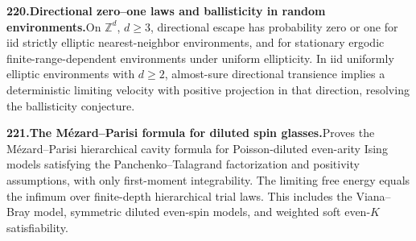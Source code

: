 \documentclass[11pt,a4paper]{article}
\begin{document}
  \par \begin{minipage}{\linewidth}
  \fontsize{10.5}{12.6}\selectfont\RaggedRight
  \hypertarget{result 220}{}
  {\bfseries\textcolor{muted}{220.}\enspace Directional zero--one laws and ballisticity in random environments.}\enspace On $\mathbb Z^d$, $d\ge3$, directional escape has probability zero or one for iid strictly elliptic nearest-neighbor environments, and for stationary ergodic finite-range-dependent environments under uniform ellipticity. In iid uniformly elliptic environments with $d\ge2$, almost-sure directional transience implies a deterministic limiting velocity with positive projection in that direction, resolving the ballisticity conjecture.\par
  \end{minipage}\par\vspace{5pt}



  \par \begin{minipage}{\linewidth}
  \fontsize{10.5}{12.6}\selectfont\RaggedRight
  \hypertarget{result 221}{}
  {\bfseries\textcolor{muted}{221.}\enspace The M\'ezard--Parisi formula for diluted spin glasses.}\enspace Proves the M\'ezard--Parisi hierarchical cavity formula for Poisson-diluted even-arity Ising models satisfying the Panchenko--Talagrand factorization and positivity assumptions, with only first-moment integrability. The limiting free energy equals the infimum over finite-depth hierarchical trial laws. This includes the Viana--Bray model, symmetric diluted even-spin models, and weighted soft even-$K$ satisfiability.\par
  \end{minipage}\par\vspace{5pt}
\end{document}
